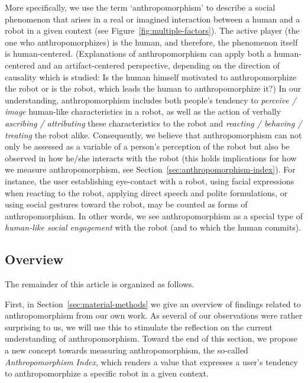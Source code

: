 \documentclass{frontiersSCNS} %
\begin{document}
More specifically, we use the term `anthropomorphism' to describe a social phenomenon that arises in a real or imagined interaction between a human and a robot in a given context (see Figure~\ref{fig:multiple-factors}). The active player (the one who anthropomorphizes) is the human, and therefore, the phenomenon itself is human-centered. (Explanations of anthropomorphism can apply both a human-centered and an artifact-centered perspective, depending on the direction of causality which is studied: Is the human himself motivated to anthropomorphize the robot or is the robot, which leads the human to anthropomorphize it?) In our understanding, anthropomorphism includes both people's tendency to \textit{perceive / image} human-like characteristics in a robot, as well as the action of verbally \textit{ascribing / attributing} these characteristics to the robot and \textit{reacting / behaving / treating} the robot alike. Consequently, we believe that anthropomorphism can not only be assessed as a variable of a person's perception of the robot but also be observed in how he/she interacts with the robot (this holds implications for how we measure anthropomorphism, see Section~\ref{sec:anthropomorphism-index}). For instance, the user establishing eye-contact with a robot, using facial expressions when reacting to the robot, applying direct speech and polite formulations, or using social gestures toward the robot, may be counted as forms of anthropomorphism. In other words, we see anthropomorphism as a special type of \textit{human-like social engagement} with the robot (and to which the human commits).

\subsection{Overview}

The remainder of this article is organized as follows.

First, in Section~\ref{sec:material-methods} we give an overview of findings related to anthropomorphism from our own work. As several of our observations were rather surprising to us, we will use this to stimulate the reflection on the current understanding of anthropomorphism. Toward the end of this section, we propose a new concept towards measuring anthropomorphism, the so-called \textit{Anthropomorphism Index}, which renders a value that expresses a user's tendency to anthropomorphize a specific robot in a given context. 
\end{document}
